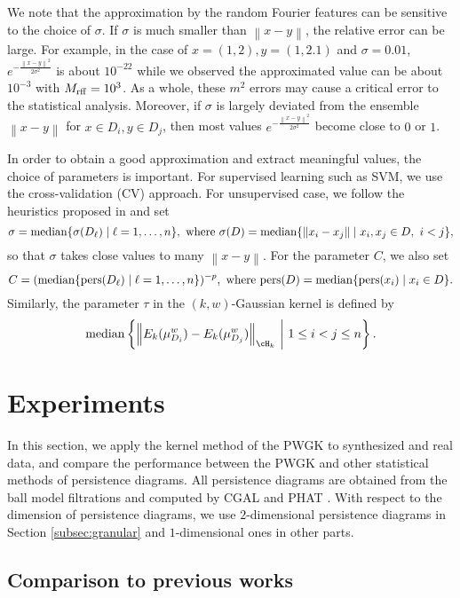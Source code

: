\documentclass{article}
\newcommand{\pers}{{\rm pers}}
\newcommand{\median}{{\rm median}}
\newcommand{\lmid}{ \ \middle| \ }
\providecommand{\norm}[1]{\left\lVert#1\right\rVert}
\providecommand{\rl}[1]{\left\{ #1 \right\}}
\providecommand{\dk}[4]{\norm{E_{#1}(\mu^{#2}_{#3}) - E_{#1}(\mu^{#2}_{#4})}_{\cH_{#1}}}
\begin{document}
We note that the approximation by the random Fourier features can be sensitive to the choice of $\sigma$.
If $\sigma$ is much smaller than $\norm{x-y}$, the relative error can be large.  
For example, in the case of $x=(1,2),y=(1,2.1)$ and $\sigma=0.01$, $e^{-\frac{\norm{x-y}^{2}}{2\sigma^{2}}}$ is about $10^{-22}$ while we observed the approximated value can be about $10^{-3}$ with $M_{{\rm rff}}=10^{3}$.
As a whole, these $m^{2}$ errors may cause a critical error to the statistical analysis.
Moreover, if $\sigma$ is largely deviated from the ensemble $\norm{x-y}$ for $x \in D_{i},y \in D_{j}$, then most values $e^{-\frac{\norm{x-y}^{2}}{2 \sigma^{2}}}$ become close to $0$ or $1$.

In order to obtain a good approximation and extract meaningful values, the choice of parameters is important.  For supervised learning such as SVM, we use the cross-validation (CV) approach.  For unsupervised case, we follow the heuristics proposed in \cite{GFTSSS07} and set 
\[
\sigma =\median \{ \sigma(D_{\ell}) \mid \ell=1,\ldots,n\}, \mbox{ where } \sigma(D)=\median \{ \norm{x_{i}-x_{j}} \mid x_{i},x_{j} \in D, \ i<j \},
\]
so that $\sigma$ takes close values to many $\norm{x-y}$.
For the parameter $C$, we also set 
\[
C=( \median \{\pers(D_{\ell}) \mid \ell=1,\ldots,n\} )^{-p},  \mbox{ where } \pers(D)=\median \{ \pers(x_{i}) \mid x_{i} \in D \}.
\]
Similarly, the parameter $\tau$ in the $(k,w)$-Gaussian kernel is defined by 
\begin{align}
\median \rl{ \dk{k}{w}{D_{i}}{D_{j}}  \lmid 1 \leq i < j \leq n}. \label{eq:tau}
\end{align}



\section{Experiments}
\label{sec:experiment}

In this section, we apply the kernel method of the PWGK to synthesized and real data, and compare the performance between the PWGK and other statistical methods of persistence diagrams. 
All persistence diagrams are obtained from the ball model filtrations and computed by CGAL \cite{DLY15} and PHAT \cite{BKRW14}. 
With respect to the dimension of persistence diagrams, we use $2$-dimensional persistence diagrams in Section \ref{subsec:granular} and $1$-dimensional ones in other parts.

\subsection{Comparison to previous works}
\label{subsec:comparison}
\end{document}
